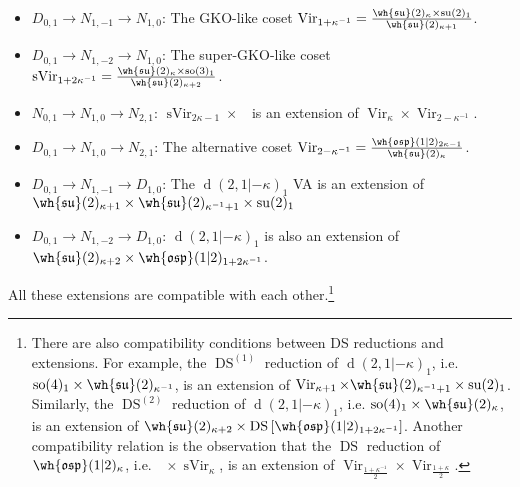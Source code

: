 \documentclass[11pt,reqno]{amsart}
\theoremstyle{plain}
\numberwithin{equation}{section}
\newcommand{\R}{\mathbb{R}}
\DeclareMathOperator{\Vir}{Vir}
\DeclareMathOperator{\sVir}{sVir}
\DeclareMathOperator{\td}{d}
\DeclareMathOperator{\tsu}{su}
\DeclareMathOperator{\tso}{so}
\DeclareMathOperator{\DS}{DS}
\DeclareMathOperator{\Ff}{\bigwedge_{\R}}
\theoremstyle{definition}
\begin{document}
\begin{itemize}
\item $D_{0,1} \to N_{1,-1} \to N_{1,0}$: The GKO-like coset $\Vir_{1+\kappa^{-1}} =
  \frac{\wh{\mathfrak{su}}(2)_{\kappa} \times
    \tsu(2)_1}{\wh{\mathfrak{su}}(2)_{\kappa+1}}$. 

\medskip

\item $D_{0,1} \to N_{1,-2} \to N_{1,0}$:  The super-GKO-like coset $\sVir_{1+2 \kappa^{-1}} =
  \frac{\wh{\mathfrak{su}}(2)_{\kappa} \times
    \tso(3)_1}{\wh{\mathfrak{su}}(2)_{\kappa+2}}$. 

\medskip

\item $N_{0,1} \to N_{1,0} \to N_{2,1}$: $\sVir_{2\kappa-1} \times \Ff$ is an extension of
$\Vir_{\kappa} \times \Vir_{2-\kappa^{-1}}$. 

\medskip

\item $D_{0,1} \to N_{1,0} \to N_{2,1}$: The alternative coset $\Vir_{2-\kappa^{-1}}  =
  \frac{\wh{\mathfrak{osp}}(1|2)_{2\kappa-1}}{\wh{\mathfrak{su}}(2)_{\kappa}}$. 

\medskip

\item $D_{0,1} \to N_{1,-1} \to D_{1,0}$: The $\td(2,1|-\kappa)_1$ VA is an extension of
  $\wh{\mathfrak{su}}(2)_{\kappa+1} \times \wh{\mathfrak{su}}(2)_{\kappa^{-1}+1}
  \times \tsu(2)_1$ 

\medskip

\item $D_{0,1} \to N_{1,-2} \to D_{1,0}$: $\td(2,1|-\kappa)_1$ is also an extension of $\wh{\mathfrak{su}}(2)_{\kappa+2} \times \wh{\mathfrak{osp}}(1|2)_{1
    + 2 \kappa^{-1}}$.
\end{itemize}

\medskip

All these extensions are compatible with each other.\footnote{
There are also compatibility conditions between DS reductions and
extensions. For example,
the $\DS^{(1)}$ reduction of $\td(2,1|-\kappa)_1$, i.e. $\tso(4)_1
\times \wh{\mathfrak{su}}(2)_{\kappa^{-1}}$,
is an extension of $\Vir_{\kappa+1} \times
 \wh{\mathfrak{su}}(2)_{\kappa^{-1}+1} \times \tsu(2)_1$.
 Similarly, the $\DS^{(2)}$ reduction of $\td(2,1|-\kappa)_1$,
i.e. $\tso(4)_1 \times \wh{\mathfrak{su}}(2)_{\kappa}$,
is an extension of $\wh{\mathfrak{su}}(2)_{\kappa+2} \times \DS
\left[\wh{\mathfrak{osp}}(1|2)_{1 + 2 \kappa^{-1}}\right]$.
 Another compatibility relation is the observation that the $\DS$ reduction of 
$\wh{\mathfrak{osp}}(1|2)_{\kappa}$, i.e. $\Ff \times \sVir_\kappa$, is an
extension of $\Vir_{\frac{1+\kappa^{-1}}{2}} \times
\Vir_{\frac{1+\kappa}{2}}$.}
\end{document}
